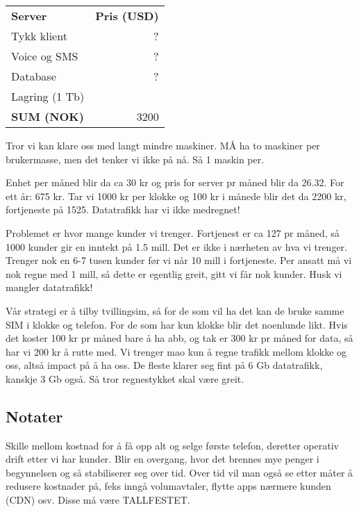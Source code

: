 \begin{table}[h]
\begin{tabular}{lr}
\textbf{Server}      & \textbf{Pris (USD)} \\
Tykk klient       & ? \\
Voice og SMS      & ? \\
Database          & ? \\
Lagring (1 Tb)    & \\
\textbf{SUM (NOK)} & 3200 \\
\end{tabular}
\end{table}

Tror vi kan klare oss med langt mindre maskiner. MÅ ha to maskiner per
brukermasse, men det tenker vi ikke på nå. Så 1 maskin per.

Enhet per måned blir da ca 30 kr og pris for server pr måned blir da 26.32.
For ett år: 675 kr. Tar vi 1000 kr per klokke og 100 kr i månede blir det da
2200 kr, fortjeneste på 1525. Datatrafikk har vi ikke medregnet!

Problemet er hvor mange kunder vi trenger. Fortjenest er ca 127 pr måned, så
1000 kunder gir en inntekt på 1.5 mill. Det er ikke i nærheten av hva vi
trenger. Trenger nok en 6-7 tusen kunder før vi når 10 mill i fortjeneste.
Per ansatt må vi nok regne med 1 mill, så dette er egentlig greit, gitt vi får
nok kunder. Husk vi mangler datatrafikk!

Vår strategi er å tilby tvillingsim, så for de som vil ha det kan de bruke
samme SIM i klokke og telefon. For de som har kun klokke blir det noenlunde
likt. Hvis det koster 100 kr pr måned bare å ha abb, og tak er 300 kr pr måned
for data, så har vi 200 kr å rutte med. Vi trenger mao kun å regne trafikk
mellom klokke og oss, altså impact på å ha oss. De fleste klarer seg fint på 6
Gb datatrafikk, kanskje 3 Gb også. Så tror regnestykket skal være greit.

\subsection{Notater}

Skille mellom kostnad for å få opp alt og selge første telefon, deretter
operativ drift etter vi har kunder. Blir en overgang, hvor det brennes mye
penger i begynnelsen og så stabiliserer seg over tid. Over tid vil man også se
etter måter å redusere kostnader på, feks inngå volumavtaler, flytte apps
nærmere kunden (CDN) osv. Disse må være TALLFESTET.


